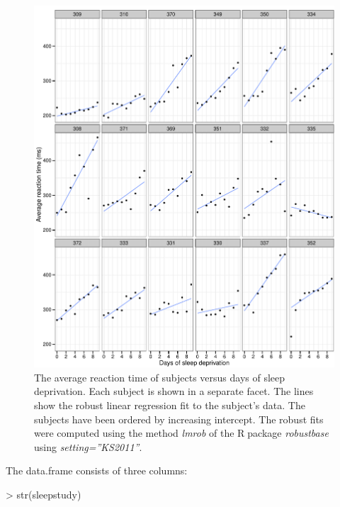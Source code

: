 \documentclass[11pt, a4paper]{article}
\newcommand*{\Rp}{\textsf{R}$\;$}
\renewenvironment{Schunk}{\vspace{\topsep}}{\vspace{\topsep}}
\theoremstyle{note}
\begin{document}
\begin{figure}[htbp]
  \centering
  \includegraphics{figs/fig-ex-sleepstudy-raw}
  \caption{The average reaction time of subjects versus days of sleep
    deprivation. Each subject is shown in a separate facet. The lines show
    the robust linear regression fit to the subject's data. The subjects
    have been ordered by increasing intercept. The robust fits were
    computed using the method \emph{lmrob} of the \Rp package
    \emph{robustbase} \citep{robustbase} using \emph{setting=''KS2011''}.}
  \label{fig:sleepstudyRaw}
\end{figure}

The data.frame consists of three columns:

\begin{Schunk}
\begin{Sinput}
> str(sleepstudy)
\end{Sinput}
\end{Schunk}
\end{document}
